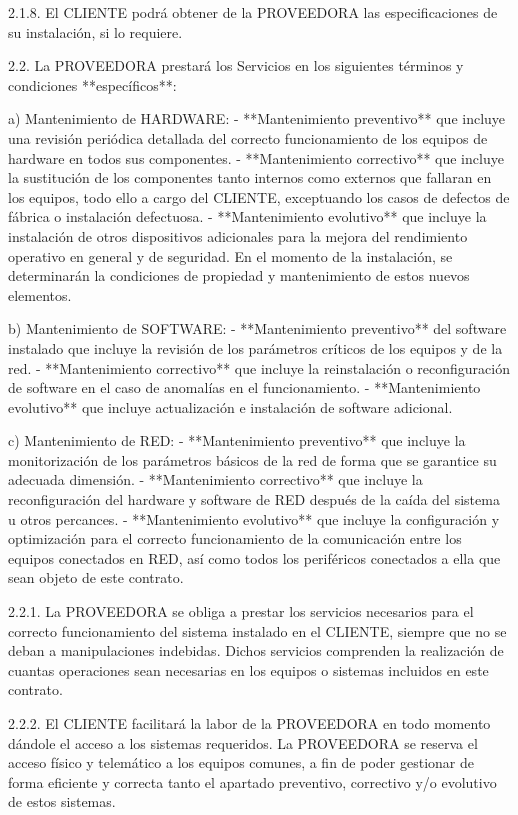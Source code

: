 2.1.8. El CLIENTE podrá obtener de la PROVEEDORA las especificaciones de su instalación, si lo requiere.

2.2. La PROVEEDORA prestará los Servicios en los siguientes términos y condiciones **específicos**:

a) Mantenimiento de HARDWARE:
	- **Mantenimiento preventivo** que incluye 
		una revisión periódica detallada del correcto funcionamiento
		de los equipos de hardware en todos sus componentes.
	- **Mantenimiento correctivo** que incluye
		la sustitución de los componentes tanto internos como externos que fallaran en los equipos,
		todo ello a cargo del CLIENTE,
		exceptuando los casos de defectos de fábrica o instalación defectuosa.
	- **Mantenimiento evolutivo** que incluye
		la instalación de otros dispositivos adicionales
		para la mejora del rendimiento operativo en general y de seguridad.
		En el momento de la instalación, 
		se determinarán la condiciones de propiedad y mantenimiento de estos nuevos elementos.

b) Mantenimiento de SOFTWARE:
	- **Mantenimiento preventivo** del software instalado que incluye
		la revisión de los parámetros críticos de los equipos y de la red.
	- **Mantenimiento correctivo** que incluye
		la reinstalación o reconfiguración de software en el caso de anomalías en el funcionamiento.
	- **Mantenimiento evolutivo** que incluye
		actualización e instalación de software adicional.
 
c) Mantenimiento de RED: 
	- **Mantenimiento preventivo** que incluye
		la monitorización de los parámetros básicos de la red
		de forma que se garantice su adecuada dimensión.
	- **Mantenimiento correctivo** que incluye
		la reconfiguración del hardware y software de RED
		después de la caída del sistema u otros percances.
	- **Mantenimiento evolutivo** que incluye
		la configuración y optimización para el correcto funcionamiento
		de la comunicación entre los equipos conectados en RED,
		así como todos los periféricos conectados a ella que sean objeto de este contrato.
		
2.2.1. La PROVEEDORA se obliga a prestar los servicios necesarios para el correcto funcionamiento del sistema instalado en el CLIENTE, siempre que no se deban a manipulaciones indebidas. 
Dichos servicios comprenden la realización de cuantas operaciones sean necesarias en los equipos o sistemas incluidos en este contrato.

2.2.2. El CLIENTE facilitará la labor de la PROVEEDORA en todo momento dándole el acceso a los sistemas requeridos. La PROVEEDORA se reserva el acceso físico y telemático a los equipos comunes, a fin de poder
gestionar de forma eficiente y correcta tanto el apartado preventivo, correctivo y/o evolutivo de estos sistemas.


